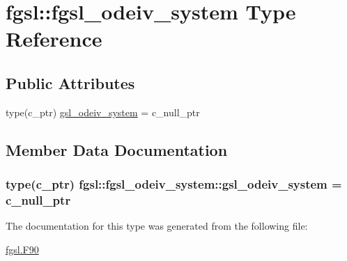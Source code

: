 \hypertarget{structfgsl_1_1fgsl__odeiv__system}{}\section{fgsl\+:\+:fgsl\+\_\+odeiv\+\_\+system Type Reference}
\label{structfgsl_1_1fgsl__odeiv__system}
\subsection*{Public Attributes}
\begin{DoxyCompactItemize}
\item 
type(c\+\_\+ptr) \hyperlink{structfgsl_1_1fgsl__odeiv__system_a60ca24aa0fb6a166f2fd72be4c807321}{gsl\+\_\+odeiv\+\_\+system} = c\+\_\+null\+\_\+ptr
\end{DoxyCompactItemize}


\subsection{Member Data Documentation}
\hypertarget{structfgsl_1_1fgsl__odeiv__system_a60ca24aa0fb6a166f2fd72be4c807321}{}
\subsubsection[{gsl\+\_\+odeiv\+\_\+system}]{\setlength{\rightskip}{0pt plus 5cm}type(c\+\_\+ptr) fgsl\+::fgsl\+\_\+odeiv\+\_\+system\+::gsl\+\_\+odeiv\+\_\+system = c\+\_\+null\+\_\+ptr}\label{structfgsl_1_1fgsl__odeiv__system_a60ca24aa0fb6a166f2fd72be4c807321}


The documentation for this type was generated from the following file\+:\begin{DoxyCompactItemize}
\item 
\hyperlink{fgsl_8F90}{fgsl.\+F90}\end{DoxyCompactItemize}

